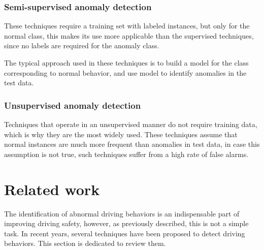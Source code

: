 \subsubsection{Semi-supervised anomaly detection}

These techniques require a training set with labeled instances, but only for the normal class, this makes its use more applicable than the supervised techniques, since no labels are required for the anomaly class.

\vspace{5mm} %

The typical approach used in these techniques is to build a model for the class corresponding to normal behavior, and use model to identify anomalies in the test data.

\subsubsection{Unsupervised anomaly detection}

Techniques that operate in an unsupervised manner do not require training data, which is why they are the most widely used. These techniques assume that normal instances are much more frequent than anomalies in test data, in case this assumption is not true, such techniques suffer from a high rate of false alarms.

\section{Related work}

The identification of abnormal driving behaviors is an indispensable part of improving driving safety, however, as previously described, this is not a simple task. In recent years, several techniques have been proposed to detect driving behaviors. This section is dedicated to review them.

